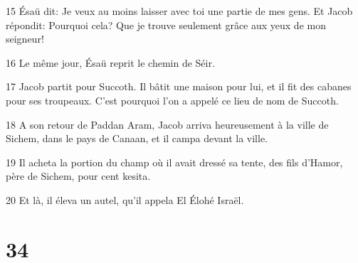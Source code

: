 \par 15 Ésaü dit: Je veux au moins laisser avec toi une partie de mes gens. Et Jacob répondit: Pourquoi cela? Que je trouve seulement grâce aux yeux de mon seigneur!
\par 16 Le même jour, Ésaü reprit le chemin de Séir.
\par 17 Jacob partit pour Succoth. Il bâtit une maison pour lui, et il fit des cabanes pour ses troupeaux. C'est pourquoi l'on a appelé ce lieu de nom de Succoth.
\par 18 A son retour de Paddan Aram, Jacob arriva heureusement à la ville de Sichem, dans le pays de Canaan, et il campa devant la ville.
\par 19 Il acheta la portion du champ où il avait dressé sa tente, des fils d'Hamor, père de Sichem, pour cent kesita.
\par 20 Et là, il éleva un autel, qu'il appela El Élohé Israël.

\chapter{34}

